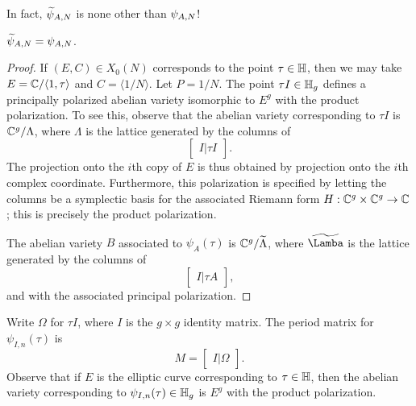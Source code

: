 \documentclass{amsart}
\begin{document}
In fact, $\widetilde{\psi}_{A,N}$ is none other than $\psi_{A,N}$!
\begin{proposition}
  $\widetilde{\psi}_{A,N} = \psi_{A,N}$.
\end{proposition}

\begin{proof}
  If $(E, C) \in X_0(N)$ corresponds to the point $\tau \in \mathbb{H}$, then we may take $E = \mathbb{C}/\langle 1, \tau \rangle$ and $C = \langle 1/N \rangle$. Let $P = 1/N$. The point $\tau I \in \mathbb{H}_g$ defines a principally polarized abelian variety isomorphic to $E^g$ with the product polarization. To see this, observe that the abelian variety corresponding to $\tau I$ is $\mathbb{C}^g/\Lambda$, where $\Lambda$ is the lattice generated by the columns of
  \[
    \begin{bmatrix}
      I | \tau I
    \end{bmatrix}.
  \]
  The projection onto the $i$th copy of $E$ is thus obtained by projection onto the $i$th complex coordinate. Furthermore, this polarization is specified by letting the columns be a symplectic basis for the associated Riemann form $H: \mathbb{C}^g \times \mathbb{C}^g \to \mathbb{C}$; this is precisely the product polarization.

  The abelian variety $B$ associated to $\psi_A(\tau)$ is $\mathbb{C}^g/\widetilde{\Lambda}$, where $\tilde{\Lamba}$ is the lattice generated by the columns of
  \[
    \begin{bmatrix}
      I | \tau A
    \end{bmatrix},
  \]
  and with the associated principal polarization.
\end{proof}
Write $\Omega$ for $\tau I$, where $I$ is the $g \times g$ identity matrix. The period matrix for $\psi_{I,n}(\tau)$ is
\[
  M = \begin{bmatrix}
    I | \Omega
  \end{bmatrix}.
\]
Observe that if $E$ is the elliptic curve corresponding to $\tau \in \mathbb{H}$, then the abelian variety corresponding to $\psi_{I,n}(\tau) \in \mathbb{H}_g$ is $E^g$ with the product polarization.
\end{document}
